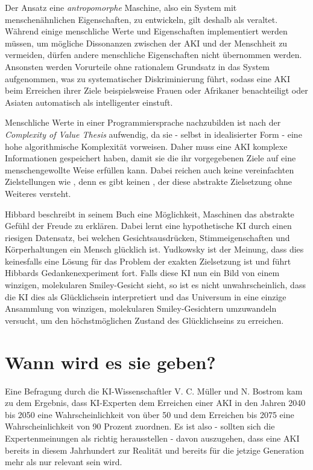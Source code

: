 Der Ansatz eine \emph{antropomorphe} Maschine, also ein System mit menschenähnlichen Eigenschaften, zu entwickeln, gilt deshalb als veraltet. Während einige menschliche Werte und Eigenschaften implementiert werden müssen, um mögliche Dissonanzen zwischen der AKI und der Menschheit zu vermeiden, dürfen andere menschliche Eigenschaften nicht übernommen werden. Ansonsten werden Vorurteile ohne rationalem Grundsatz in das System aufgenommen, was zu systematischer Diskriminierung führt, sodass eine AKI beim Erreichen ihrer Ziele beispielsweise Frauen oder Afrikaner benachteiligt oder Asiaten automatisch als intelligenter einstuft.

Menschliche Werte in einer Programmiersprache nachzubilden ist nach der \emph{Complexity of Value Thesis} aufwendig, da sie - selbst in idealisierter Form - eine hohe algorithmische Komplexität vorweisen. Daher muss eine AKI komplexe Informationen gespeichert haben, damit sie die ihr vorgegebenen Ziele auf eine menschengewollte Weise erfüllen kann. Dabei reichen auch keine vereinfachten Zielstellungen wie  , denn es gibt keinen , der diese abstrakte Zielsetzung ohne Weiteres versteht.

Hibbard beschreibt in seinem Buch eine Möglichkeit, Maschinen das abstrakte Gefühl der Freude zu erklären. Dabei lernt eine hypothetische KI durch einen riesigen Datensatz, bei welchen Gesichtsausdrücken, Stimmeigenschaften und Körperhaltungen ein Mensch glücklich ist. Yudkowsky ist der Meinung, dass dies keinesfalls eine Lösung für das Problem der exakten Zielsetzung ist und führt Hibbards Gedankenexperiment fort. Falls diese KI nun ein Bild von einem winzigen, molekularen Smiley-Gesicht sieht, so ist es nicht unwahrscheinlich, dass die KI dies als Glücklichsein interpretiert und das Universum in eine einzige Ansammlung von winzigen, molekularen Smiley-Gesichtern umzuwandeln versucht, um den höchstmöglichen Zustand des Glücklichseins zu erreichen. 

\section{Wann wird es sie geben?}
Eine Befragung durch die KI-Wissenschaftler V. C. Müller und N. Bostrom kam zu dem Ergebnis, dass KI-Experten dem Erreichen einer AKI in den Jahren 2040 bis 2050 eine Wahrscheinlichkeit von über 50 und dem Erreichen bis 2075 eine Wahrscheinlichkeit von 90 Prozent zuordnen.  Es ist also - sollten sich die Expertenmeinungen als richtig herausstellen - davon auszugehen, dass eine AKI bereits in diesem Jahrhundert zur Realität und bereits für die jetzige Generation mehr als nur relevant sein wird. 

